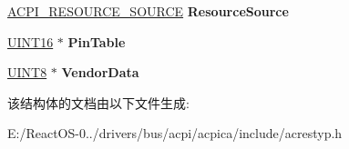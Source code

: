 \begin{DoxyCompactItemize}
\mbox{\label{structacpi__resource__pin__function_a336c14c8e4fdedb943e034840207b50e}} 
\hyperlink{structacpi__resource__source}{A\+C\+P\+I\+\_\+\+R\+E\+S\+O\+U\+R\+C\+E\+\_\+\+S\+O\+U\+R\+CE} {\bfseries Resource\+Source}
\item 
\mbox{\label{structacpi__resource__pin__function_aa0eb0186abad7fbb9b7b60b04150c1c0}} 
\hyperlink{_processor_bind_8h_a09f1a1fb2293e33483cc8d44aefb1eb1}{U\+I\+N\+T16} $\ast$ {\bfseries Pin\+Table}
\item 
\mbox{\label{structacpi__resource__pin__function_a84cd70b4fc7a37acf5f8d4255e51e0c5}} 
\hyperlink{_processor_bind_8h_ab27e9918b538ce9d8ca692479b375b6a}{U\+I\+N\+T8} $\ast$ {\bfseries Vendor\+Data}
\end{DoxyCompactItemize}


该结构体的文档由以下文件生成\+:\begin{DoxyCompactItemize}
\item 
E\+:/\+React\+O\+S-\/0../drivers/bus/acpi/acpica/include/acrestyp.\+h\end{DoxyCompactItemize}
